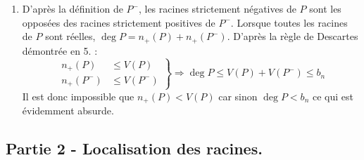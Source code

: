 \begin{enumerate}
\begin{enumerate}
  de ces {\'e}quations, on obtient
  \begin{eqnarray}
  \card I &=& V(P)-V(P,P^-)\\
  \card J &=& V(P^-)-V(P,P^-)\\
  \card K=V(P,P^-)
  \end{eqnarray}
  Si $k\in I \cup J, b_{k-1}-b_k\geq 1$, si $k\in K, b_{k-1}-b_k\geq
  1$. En ne tenant compte que des $k$ dans $I$, $J$ ou $K$, on peut {\'e}crire
\begin{multline*}
b_n = \sum_{k\in\{0,\cdots,n\} } (b_{k+1}-b_k) 
    \geq \sum_{k\in I \cup J} (b_{k+1}-b_k) + \sum_{k\in K}
    (b_{k+1}-b_k)\\
    \geq \card I + \card J +\card K \\
    \geq (V(P)-V(P,P^-))+(V(P^-)-V(P,P^-))+2V(P,P^-)\\
    \geq V(P)+ V(P^-)
\end{multline*}
  \item D'apr{\`e}s la d{\'e}finition de $P^-$, les racines strictement n{\'e}gatives de $P$ sont les oppos{\'e}es des racines strictement positives de $P^-$. Lorsque toutes les racines de $P$ sont r{\'e}elles, $\deg P =n_+(P) + n_+(P^-)$. \newline
  D'apr{\`e}s la r{\`e}gle de Descartes d{\'e}montr{\'e}e en 5. :
\begin{displaymath}
\left. 
\begin{aligned}
n_+(P)&\leq  V(P) \\ n_+(P^-)&\leq V(P^-)  
\end{aligned}
\right\rbrace 
 \Rightarrow \deg P \leq V(P)+V(P^-)\leq b_n
\end{displaymath}
Il est donc impossible que $n_+(P)< V(P)$ car sinon $\deg P < b_n$ ce qui est {\'e}videmment absurde.
\end{enumerate}
\end{enumerate}

\subsection*{Partie 2 - Localisation des racines.}

